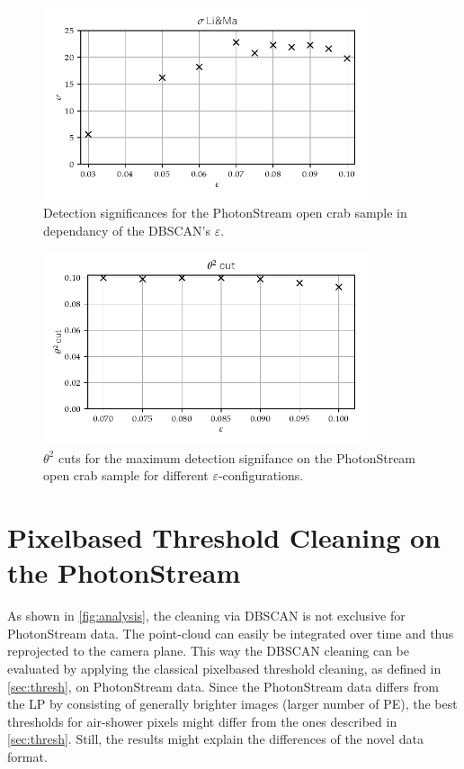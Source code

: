 %
\begin{figure}
  \centering
  \includegraphics[width=0.85\textwidth]{Plots/Epsilon/eps_sigma.pdf}
  \caption{Detection significances for the PhotonStream open crab sample in dependancy of the DBSCAN's $\varepsilon$.}
  \label{fig:eps_sigma}
\end{figure}
%
\begin{figure}
  \centering
  \includegraphics[width=0.85\textwidth]{Plots/Epsilon/eps_theta_cut.pdf}
  \caption{$\theta^2$ cuts for the maximum detection signifance on the PhotonStream open crab sample for different $\varepsilon$-configurations.}
  \label{fig:eps_theta}
\end{figure}

\section{Pixelbased Threshold Cleaning on the PhotonStream}
%
As shown in \autoref{fig:analysis}, the cleaning via DBSCAN is not exclusive
for PhotonStream data. The point-cloud can easily be integrated over time and
thus reprojected to the camera plane. This way the DBSCAN cleaning can be
evaluated by applying the classical pixelbased threshold cleaning, as defined
in \autoref{sec:thresh}, on PhotonStream data. Since the PhotonStream data
differs from the LP by consisting of generally brighter images (larger number
of PE), the best thresholds for air-shower pixels might differ from the ones
described in \autoref{sec:thresh}. Still, the results might explain the
differences of the novel data format.

